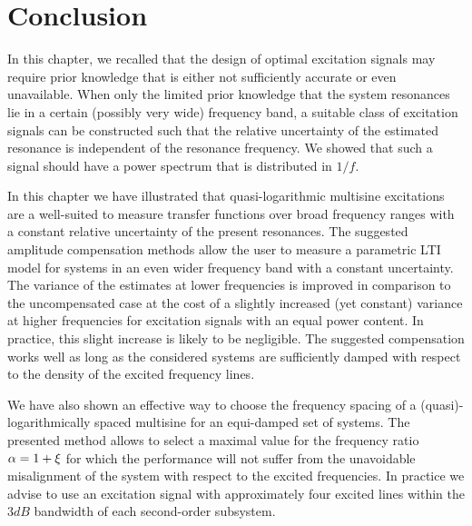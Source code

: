 \section{Conclusion}
\label{sec:excitation:conclusion}
In this chapter, we recalled that the design of optimal excitation signals may require prior knowledge that is either not sufficiently accurate or even unavailable.
When only the limited prior knowledge that the system resonances lie in a certain (possibly very wide) frequency band, a suitable class of excitation signals can be constructed such that the relative uncertainty of the estimated resonance is independent of the resonance frequency.
We showed that such a signal should have a power spectrum that is distributed in $1/f$.

In this chapter we have illustrated that quasi-logarithmic multisine excitations are a well-suited to measure transfer functions over broad frequency ranges with a constant relative uncertainty of the present resonances.
The suggested amplitude compensation methods allow the user to measure a parametric \gls{LTI} model for systems in an even wider frequency band with a constant uncertainty.
The variance of the estimates at lower frequencies is improved in comparison to the uncompensated case at the cost of a slightly increased (yet constant) variance at higher frequencies for excitation signals with an equal power content.
In practice, this slight increase is likely to be negligible.
The suggested compensation works well as long as the considered systems are sufficiently damped with respect to the density of the excited frequency lines.

We have also shown an effective way to choose the frequency spacing of a (quasi)-logarithmically spaced multisine for an equi-damped set of systems.
The presented method allows to select a maximal value for the frequency ratio $\alpha = 1 + \xi_{}$ for which the performance will not suffer from the unavoidable misalignment of the system with respect to the excited frequencies.
In practice we advise to use an excitation signal with approximately four excited lines within the $3\unit{dB}$ bandwidth of each second-order subsystem.


